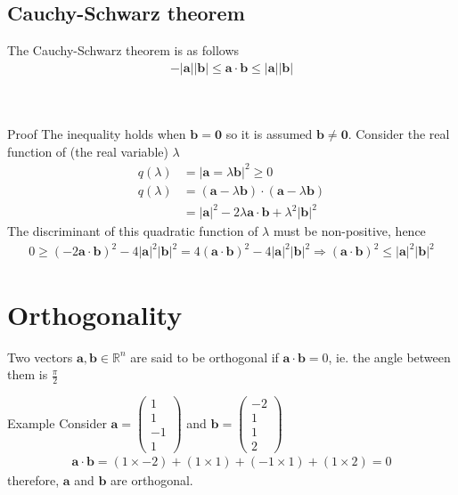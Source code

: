 \documentclass{report}
\newcommand{\cvec}[1]{ \begin{pmatrix} #1 \end{pmatrix} }
\begin{document}
	\subsection{Cauchy-Schwarz theorem}

		The Cauchy-Schwarz theorem is as follows
			\begin{align*}
				-|\mathbf{a}||\mathbf{b}| \leq \mathbf{a} \cdot \mathbf{b} \leq |\mathbf{a}||\mathbf{b}|
			\end{align*}
		\\ \\
		\begin{question}{Proof}
			The inequality holds when $\mathbf{b} = \mathbf{0}$ so it is assumed $\mathbf{b} \neq \mathbf{0}$. Consider the real function of (the real variable) $\lambda$
			\begin{align*}
				q(\lambda) &= |\mathbf{a} = \lambda \mathbf{b}|^2 \geq 0	\\
				q(\lambda) &= (\mathbf{a} - \lambda \mathbf{b}) \cdot (\mathbf{a} - \lambda \mathbf{b})	\\
						   &= |\mathbf{a}|^2 - 2 \lambda \mathbf{a} \cdot \mathbf{b} + \lambda^2 |\mathbf{b}|^2
			\end{align*}
			The discriminant of this quadratic function of $\lambda$ must be non-positive, hence
			\begin{align*}
				0 \geq (-2\mathbf{a} \cdot \mathbf{b})^2 - 4|\mathbf{a}|^2|\mathbf{b}|^2 = 4(\mathbf{a} \cdot \mathbf{b})^2 - 4|\mathbf{a}|^2|\mathbf{b}|^2 \Longrightarrow (\mathbf{a} \cdot \mathbf{b})^2 \leq |\mathbf{a}|^2|\mathbf{b}|^2
			\end{align*}
		\end{question}

\section{Orthogonality}

	Two vectors $\mathbf{a}, \mathbf{b} \in \mathbb{R}^n$ are said to be orthogonal if $\mathbf{a} \cdot \mathbf{b} = 0$, ie. the angle between them is $\frac{\pi}{2}$

	\begin{question}{Example}
		Consider $\mathbf{a} = \cvec{1\\1\\-1\\1}$ and $\mathbf{b} = \cvec{-2\\1\\1\\2}$
		\begin{align*}
			\mathbf{a} \cdot \mathbf{b} = (1 \times -2) + (1 \times 1) + (-1 \times 1) + (1 \times 2) = 0
		\end{align*}
		therefore, $\mathbf{a}$ and $\mathbf{b}$ are orthogonal.
	\end{question}
\end{document}
